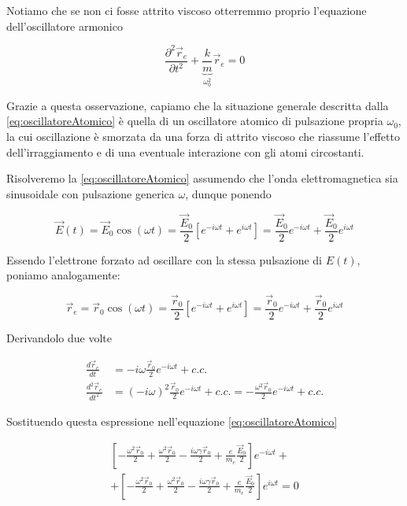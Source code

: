 Notiamo che se non ci fosse attrito viscoso otterremmo proprio l'equazione dell'oscillatore armonico

\[
	\frac{\partial^2 \vec{r}_e}{\partial t^2} + \underbrace{\frac{k}{m}}_{\omega_0^2} \vec{r}_e = 0
\]

Grazie a questa osservazione, capiamo che la situazione generale descritta dalla \eqref{eq:oscillatoreAtomico} è quella di un oscillatore atomico di pulsazione propria $ \omega_0  $, la cui oscillazione è smorzata da una forza di attrito viscoso che riassume l'effetto dell'irraggiamento e di una eventuale interazione con gli atomi circostanti.

Risolveremo la \eqref{eq:oscillatoreAtomico} assumendo che l'onda elettromagnetica sia sinusoidale con pulsazione generica $\omega$, dunque ponendo

\[
	\vec{E} (t) = \vec{E}_0 \cos (\omega t)= \frac{\vec{E}_0}{2}[e^{-i\omega t}+e^{i\omega t}  ]  = \frac{\vec{E}_0}{2}e^{-i\omega t} +\frac{\vec{E}_0}{2}e^{i\omega t}
\]

Essendo l'elettrone forzato ad oscillare con la stessa pulsazione di $E(t)$, poniamo analogamente:

\[
	\vec{r}_e = \vec{r}_0 \cos (\omega t) = \frac{\vec{r}_0}{2}[e^{-i\omega t}+e^{i\omega t}  ]  = \frac{\vec{r}_0}{2}e^{-i\omega t} +\frac{\vec{r}_0}{2}e^{i\omega t}
\]

Derivandolo due volte

\begin{equation*}
	\begin{aligned}
		\frac{d\vec{r}_e}{dt} &= -i\omega \frac{\vec{r}_0}{2}e^{-i\omega t} + c.c. \\
		\frac{d^2 \vec{r}_e}{dt^2} &= (-i\omega)^2 \frac{\vec{r}_0}{2}e^{-i\omega t} + c.c. = - \frac{\omega^2\vec{r}_0}{2}e^{-i\omega t} + c.c.
	\end{aligned}
\end{equation*}

Sostituendo questa espressione nell'equazione \eqref{eq:oscillatoreAtomico}

\begin{gather*}
	\left[ -\frac{\omega^2 \vec{r}_0}{2} +\frac{\omega^2 \vec{r}_0}{2} - \frac{i\omega \gamma \vec{r}_0}{2} + \frac{e}{m_e}\frac{\vec{E}_0}{2} \right] e^{-i\omega t} + \\
	+ \left[ -\frac{\omega^2 \vec{r}_0}{2} +\frac{\omega^2 \vec{r}_0}{2} - \frac{i\omega \gamma \vec{r}_0}{2} + \frac{e}{m_e}\frac{\vec{E}_0}{2} \right] e^{i\omega t} =0
\end{gather*}

